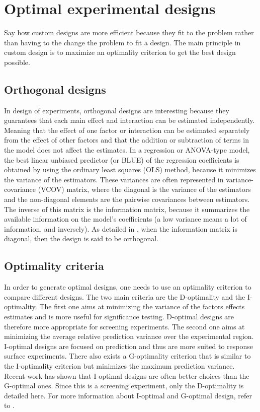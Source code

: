 
\section{Optimal experimental designs}
\begin{formal}
Say how custom designs are more efficient because they fit to the problem rather than having to the change the problem to fit a design.
The main principle in custom design is to maximize an optimality criterion to get the best design possible.
\end{formal}

\subsection{Orthogonal designs}
In design of experiments, orthogonal designs are interesting because they guarantees that each main effect and interaction can 
be estimated independently. Meaning that the effect of one factor or interaction can be estimated separately from the effect of other factors
and that the addition or subtraction of terms in the model does not affect the estimates.
In a regression or ANOVA-type model, the best linear unbiased predictor (or BLUE) of the regression coefficients is obtained by using 
the ordinary least squares (OLS) method, because it minimizes the variance of the estimators. 
These variances are often represented in variance-covariance (VCOV) matrix, 
where the diagonal is the variance of the estimators and the non-diagonal elements are the pairwise covariances between estimators. 
The inverse of this matrix is the information matrix, 
because it summarizes the available information  on the model's coefficients (a low variance means a lot of information, and inversely).
As detailed in \textcite{goos2011optimal}, when the information matrix is diagonal, then the design is said to be orthogonal.

\subsection{Optimality criteria}
In order to generate optimal designs, one needs to use an optimality criterion to compare different designs. 
The two main criteria are the D-optimality and the I-optimality. 
The first one aims at minimizing the variance of the factors effects estimates and is more useful for significance testing. 
D-optimal designs are therefore more appropriate for screening experiments. 
The second one aims at minimizing the average relative prediction variance over the experimental region. 
I-optimal designs are focused on prediction and thus are more suited to response surface experiments.
There also exists a G-optimality criterion that is similar to the I-optimality criterion but minimizes the maximum prediction variance. 
Recent work \parencite{rodriguez2010generating} has shown that I-optimal designs are often better choices than the G-optimal ones. 
Since this is a screening experiment, only the D-optimality is detailed here. 
For more information about I-optimal and G-optimal design, refer to \textcite{goos2011optimal,atkinson2014optimal}.

